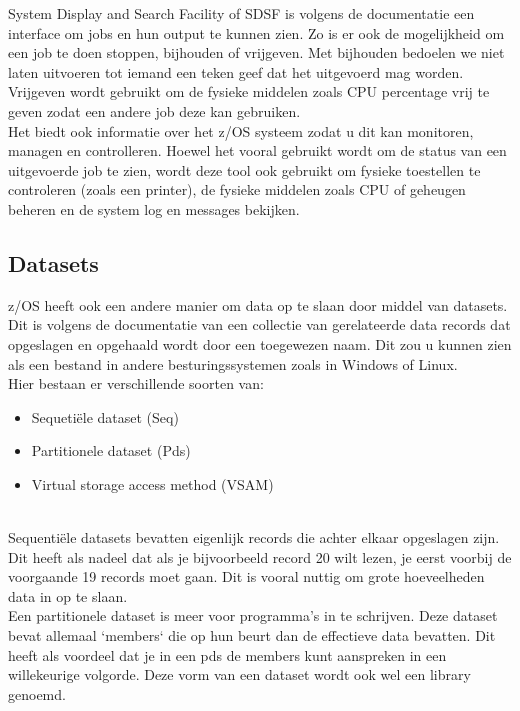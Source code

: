 System Display and Search Facility of SDSF is volgens de \textcite{IBM2023} documentatie een interface om jobs en hun output te kunnen zien. Zo is er ook de mogelijkheid om een job te doen stoppen, bijhouden of vrijgeven. Met bijhouden bedoelen we niet laten uitvoeren tot iemand een teken geef dat het uitgevoerd mag worden. Vrijgeven wordt gebruikt om de fysieke middelen zoals CPU percentage vrij te geven zodat een andere job deze kan gebruiken. \\ 
Het biedt ook informatie over het z/OS systeem zodat u dit kan monitoren, managen en controlleren. Hoewel het vooral gebruikt wordt om de status van een uitgevoerde job te zien, wordt deze tool ook gebruikt om fysieke toestellen te controleren (zoals een printer), de fysieke middelen zoals CPU of geheugen beheren en de system log en messages bekijken.

\subsection{Datasets}
z/OS heeft ook een andere manier om data op te slaan door middel van datasets. Dit is volgens de documentatie van \textcite{IBM} een collectie van gerelateerde data records dat opgeslagen en opgehaald wordt door een toegewezen naam. Dit zou u kunnen zien als een bestand in andere besturingssystemen zoals in Windows of Linux. \\

Hier bestaan er verschillende soorten van:

\begin{itemize}
    \item Sequetiële dataset (Seq)
    \item Partitionele dataset (Pds)
    \item Virtual storage access method (VSAM)
\end{itemize} \\

Sequentiële datasets bevatten eigenlijk records die achter elkaar opgeslagen zijn. Dit heeft als nadeel dat als je bijvoorbeeld record 20 wilt lezen, je eerst voorbij de voorgaande 19 records moet gaan. Dit is vooral nuttig om grote hoeveelheden data in op te slaan. \\

Een partitionele dataset is meer voor programma's in te schrijven. Deze dataset bevat allemaal `members` die op hun beurt dan de effectieve data bevatten. Dit heeft als voordeel dat je in een pds de members kunt aanspreken in een willekeurige volgorde. Deze vorm van een dataset wordt ook wel een library genoemd.

